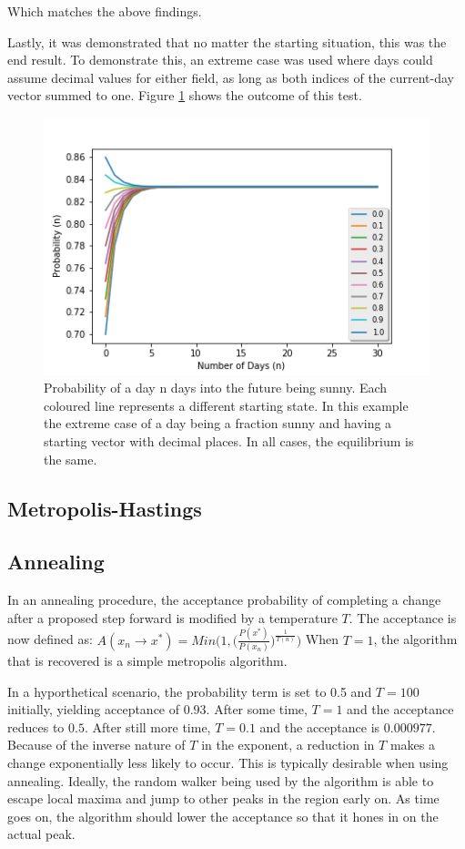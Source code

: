 \documentclass[twocolumn]{article}
\begin{document}
Which matches the above findings.

Lastly, it was demonstrated that no matter the starting situation, this was the end result. To demonstrate this, an extreme case was used where days could assume decimal values for either field, as long as both indices of the current-day vector summed to one. Figure \ref{fig:fig14} shows the outcome of this test.

\begin{figure}
\centering
\includegraphics[width=\linewidth]{fig14}
\caption{Probability of a day n days into the future being sunny. Each coloured line represents a different starting state. In this example the extreme case of a day being a fraction sunny and having a starting vector with decimal places. In all cases, the equilibrium is the same.}
\label{fig:fig14}
\end{figure}

\subsection{Metropolis-Hastings}
\subsection{Annealing}
In an annealing procedure, the acceptance probability of completing a change after a proposed step forward is modified by a temperature $T$. The acceptance is now defined as:
$A(x_n \to x^*) = Min \Bigg( 1, \Big( \frac{P(x^*)}{P(x_n)}\Big) ^{ \frac{1}{T(n)} } \Bigg)$
When $T=1$, the algorithm that is recovered is a simple metropolis algorithm. 

In a hyporthetical scenario, the probability term is set to 0.5 and $T=100$ initially, yielding acceptance of $0.93$. After some time, $T=1$ and the acceptance reduces to $0.5$. After still more time, $T=0.1$ and the acceptance is $0.000977$. Because of the inverse nature of $T$ in the exponent, a reduction in $T$ makes a change exponentially less likely to occur. This is typically desirable when using annealing. Ideally, the random walker being used by the algorithm is able to escape local maxima and jump to other peaks in the region early on. As time goes on, the algorithm should lower the acceptance so that it hones in on the actual peak.
\end{document}
